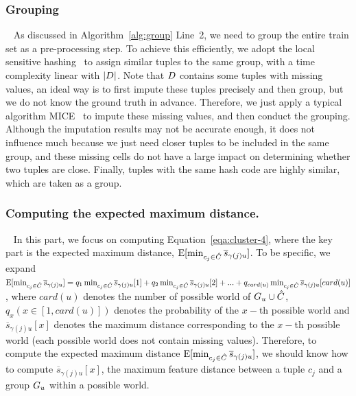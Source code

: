 \subsubsection{Grouping}~\label{subsec:clustering}
As discussed in Algorithm~\ref{alg:group} Line~2, we need to group the entire train set as a pre-processing step. To achieve this efficiently, we adopt the local sensitive hashing~\cite{DBLP:conf/focs/AndoniI06} to assign similar tuples to the same group, with a time complexity linear with $|D|$.
%
Note that $D$ contains some tuples with missing values, an ideal way is to first impute these tuples precisely and then group, but we do not know the ground truth in advance. Therefore, we just apply a typical algorithm \ie MICE~\cite{royston2011multiple} to impute these missing values, and then conduct the grouping. Although the imputation results may  not be accurate enough, it does not influence much because we just need closer tuples to be included in the same group, and these missing cells do not have a large impact on determining whether two tuples are close. 
%
Finally, tuples with the same hash code are highly similar, which are taken as a group.

 


\subsubsection{Computing the expected maximum distance.}~\label{subsec:pq} In this part, we focus on computing Equation~\ref{eqa:cluster-4}, where the key part is the expected maximum distance, \ie $\mathrm{E}[\min_{c_j\in \hat{C}}\overline{s}_{\gamma(j)u}]$. To be specific, we expand $\mathrm{E}[\min_{c_j\in \hat{C}}\overline{s}_{\gamma(j)u}] = q_1\min_{c_j\in \hat{C}}\overline{s}_{\gamma(j)u}[1] + q_2\min_{c_j\in \hat{C}}\overline{s}_{\gamma(j)u}[2] + ... +q_{card(u)}\min_{c_j\in \hat{C}}\overline{s}_{\gamma(j)u}[card(u)]$, where $card(u)$ denotes the number of possible world of $G_u \cup \hat{C}$, $q_x    (x\in [1, card(u)])$ denotes the probability of the $x-$th possible world and  $\overline{s}_{\gamma(j)u}[x]$ denotes the maximum distance  corresponding to the $x-$th possible world (each possible world does not contain missing values). 
%
%
%
Therefore, to compute the expected maximum distance $\mathrm{E}[\min_{c_j\in \hat{C}}\overline{s}_{\gamma(j)u}]$, we should know how to compute $\overline{s}_{\gamma(j)u}[x]$, \ie the  maximum feature distance between a tuple $c_j$ and a group $G_u$ within a possible world.

